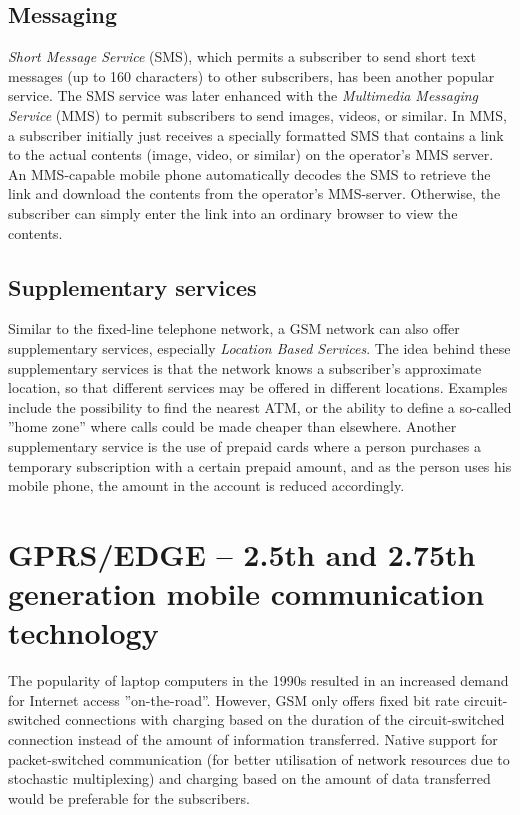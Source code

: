 \subsection{Messaging}
\emph{Short Message Service} (SMS), which permits a subscriber to send short text messages (up to 160 characters) to other subscribers, has been another popular service. The SMS service was later enhanced with the \emph{Multimedia Messaging Service} (MMS) to permit subscribers to send images, videos, or similar. In MMS, a subscriber initially just receives a specially formatted SMS that contains a link to the actual contents (image, video, or similar) on the operator's MMS server. An MMS-capable mobile phone automatically decodes the SMS to retrieve the link and download the contents from the operator's MMS-server. Otherwise, the subscriber can simply enter the link into an ordinary browser to view the contents.

\subsection{Supplementary services}
Similar to the fixed-line telephone network, a GSM network can also offer supplementary services, especially \emph{Location Based Services}. The idea behind these supplementary services is that the network knows a subscriber's approximate location, so that different services may be offered in different locations. Examples include the possibility to find the nearest ATM, or the ability to define a so-called ''home zone'' where calls could be made cheaper than elsewhere. Another supplementary service is the use of prepaid cards where a person purchases a temporary subscription with a certain prepaid amount, and as the person uses his mobile phone, the amount in the account is reduced accordingly.

\section{GPRS/EDGE -- 2.5th and 2.75th generation mobile communication technology}
The popularity of laptop computers in the 1990s resulted in an increased demand for Internet access ''on-the-road''. However, GSM only offers fixed bit rate circuit-switched connections with charging based on the duration of the circuit-switched connection instead of the amount of information transferred. Native support for packet-switched communication (for better utilisation of network resources due to stochastic multiplexing) and charging based on the amount of data transferred would be preferable for the subscribers.

